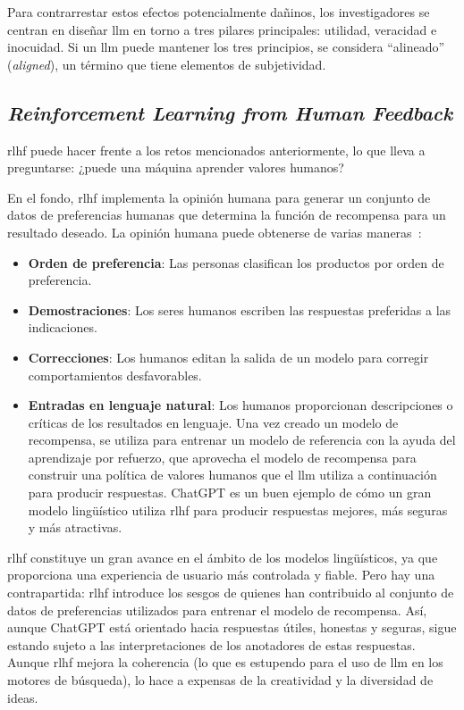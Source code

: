Para contrarrestar estos efectos potencialmente dañinos, los investigadores se centran en diseñar \acrshort{llm} en torno a tres pilares principales: utilidad, veracidad e inocuidad. Si un \acrshort{llm} puede mantener los tres principios, se considera ``alineado'' (\textit{aligned}), un término que tiene elementos de subjetividad.

\subsection{\textit{Reinforcement Learning from Human Feedback}}

\acrfull{rlhf} puede hacer frente a los retos mencionados anteriormente, lo que  lleva a preguntarse: ¿puede una máquina aprender valores humanos?

En el fondo, \acrshort{rlhf} implementa la opinión humana para generar un conjunto de datos de preferencias humanas que determina la función de recompensa para un resultado deseado. La opinión humana puede obtenerse de varias maneras~\cite{Tolaka}:

\begin{itemize}    

\item \textbf{Orden de preferencia}: Las personas clasifican los productos por orden de preferencia.

\item \textbf{Demostraciones}: Los seres humanos escriben las respuestas preferidas a las indicaciones.

\item \textbf{Correcciones}: Los humanos editan la salida de un modelo para corregir comportamientos desfavorables.

\item \textbf{Entradas en lenguaje natural}: Los humanos proporcionan descripciones o críticas de los resultados en lenguaje. Una vez creado un modelo de recompensa, se utiliza para entrenar un modelo de referencia con la ayuda del aprendizaje por refuerzo, que aprovecha el modelo de recompensa para construir una política de valores humanos que el \acrlong{llm} utiliza a continuación para producir respuestas. ChatGPT es un buen ejemplo de cómo un gran modelo lingüístico utiliza \acrshort{rlhf} para producir respuestas mejores, más seguras y más atractivas.

\end{itemize}

\acrshort{rlhf} constituye un gran avance en el ámbito de los modelos lingüísticos, ya que proporciona una experiencia de usuario más controlada y fiable. Pero hay una contrapartida: \acrshort{rlhf} introduce los sesgos de quienes han contribuido al conjunto de datos de preferencias utilizados para entrenar el modelo de recompensa. Así, aunque ChatGPT está orientado hacia respuestas útiles, honestas y seguras, sigue estando sujeto a las interpretaciones de los anotadores de estas respuestas. Aunque \acrshort{rlhf} mejora la coherencia (lo que es estupendo para el uso de \acrshort{llm} en los motores de búsqueda), lo hace a expensas de la creatividad y la diversidad de ideas.

